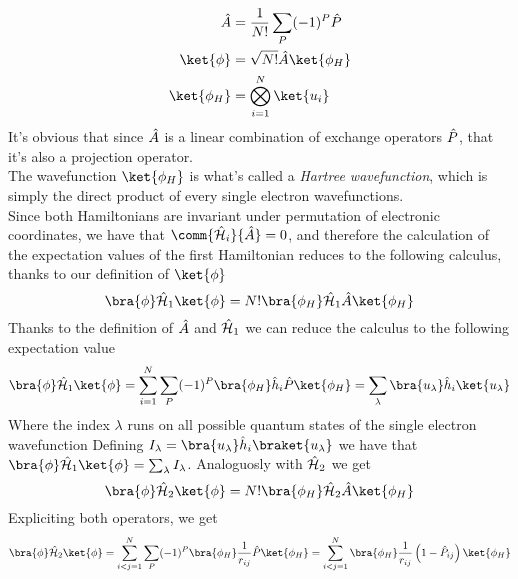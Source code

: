 \documentclass[../qm.tex]{subfiles}
\begin{document}
	\begin{equation}
		\begin{aligned}
			\opr{A}&=\frac{1}{N!}\sum_{P}(-1)^P\opr{P}\\
			\ket{\phi}&=\sqrt{N!}\opr{A}\ket{\phi_H}\\
			\ket{\phi_H}&=\bigotimes_{i=1}^N\ket{u_i}
		\end{aligned}
		\label{eq:hartreeantisymmket}
	\end{equation}
	It's obvious that since $\hat{A}$ is a linear combination of exchange operators $\hat{P}$, that it's also a projection operator.\\
	The wavefunction $\ket{\phi_H}$ is what's called a \textit{Hartree wavefunction}, which is simply the direct product of every single electron wavefunctions.\\
	Since both Hamiltonians are invariant under permutation of electronic coordinates, we have that $\comm{\opr{\ham}_i}{\opr{A}}=0$, and therefore the calculation of the expectation values of the first Hamiltonian reduces to the following calculus, thanks to our definition of $\ket{\phi}$
	\begin{equation}
		\bra{\phi}\opr{\ham}_1\ket{\phi}=N!\bra{\phi_H}\opr{\ham}_1\opr{A}\ket{\phi_H}
		\label{eq:ham1expvalhftheory}
	\end{equation}
	Thanks to the definition of $\hat{A}$ and $\hat{\mathcal{H}}_1$ we can reduce the calculus to the following expectation value
	\begin{equation}
		\bra{\phi}\opr{\ham}_1\ket{\phi}=\sum_{i=1}^N\sum_P(-1)^P\bra{\phi_H}\opr{h}_i\opr{P}\ket{\phi_H}=\sum_{\lambda}\bra{u_\lambda}\opr{h}_i\ket{u_\lambda}
		\label{eq:ham1hftheorysinglelec}
	\end{equation}
	Where the index $\lambda$ runs on all possible quantum states of the single electron wavefunction
	Defining $I_\lambda=\bra{u_\lambda}\opr{h}_i\braket{u_\lambda}$ we have that $\bra{\phi}\opr{\ham}_1\ket{\phi}=\sum_\lambda I_\lambda$. Analoguosly with $\hat{\mathcal{H}}_2$ we get
	\begin{equation}
		\bra{\phi}\opr{\ham}_2\ket{\phi}=N!\bra{\phi_H}\opr{\ham}_2\opr{A}\ket{\phi_H}
		\label{eq:ham2}
	\end{equation}
	Expliciting both operators, we get
	\begin{equation}
		\bra{\phi}\opr{\ham}_2\ket{\phi}=\sum_{i<j=1}^N\sum_P(-1)^P\bra{\phi_H}\frac{1}{r_{ij}}\opr{P}\ket{\phi_H}=\sum_{i<j=1}^N\bra{\phi_H}\frac{1}{r_{ij}}\left( 1-\opr{P}_{ij} \right)\ket{\phi_H}
		\label{eq:ham2hftheory}
	\end{equation}
\end{document}
